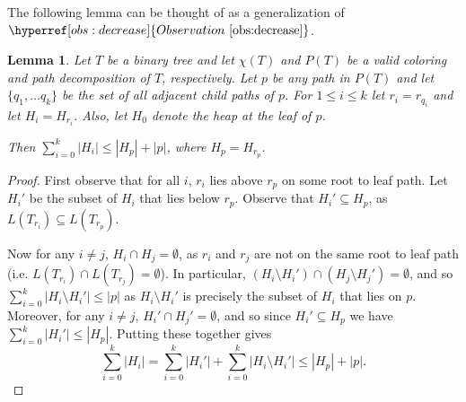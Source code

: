 \documentclass[11pt]{article}
\newtheorem{lemma}[theorem]{Lemma}
\newtheorem{definition}[theorem]{Definition}
\theoremstyle{definition}
\newcommand{\Obs}[1]{\hyperref[obs:#1]{Observation~\ref*{obs:#1}}} %
\begin{document}

The following lemma can be thought of as a generalization of $\Obs{decrease}$.

\begin{lemma}
\label{lem:adjacent}
 Let $T$ be a binary tree and let $\chi(T)$ and $P(T)$ be a valid coloring and path decomposition of $T$, respectively.
 Let $p$ be any path in $P(T)$ and let $\{q_1, \dots q_k\}$ be the set of all adjacent child paths of $p$.
 For $1\leq i\leq k$ let $r_i = r_{q_i}$ and let $H_i = H_{r_i}$.
 Also, let $H_0$ denote the heap at the leaf of $p$.
 
 Then $\sum_{i=0}^k |H_i| \leq |H_p|+|p|$, where $H_p = H_{r_p}$.
\end{lemma}
\begin{proof}
 First observe that for all $i$, $r_{i}$ lies above $r_p$ on some root to leaf path. 
 Let $H_i'$ be the subset of $H_i$ that lies below $r_p$.  Observe that $H_i'\subseteq H_p$, as $L(T_{r_i})\subseteq L(T_{r_p})$.
  
 Now for any $i\neq j$, $H_i \cap H_j = \emptyset$, as $r_{i}$ and $r_{j}$ are not on the same root to leaf path (i.e. $L(T_{r_i}) \cap L(T_{r_j}) = \emptyset$).
 In particular, $(H_i\setminus H_i') \cap (H_j \setminus H_j') = \emptyset$, and so $\sum_{i=0}^k |H_i\setminus H_i'| \leq |p|$ 
 as $H_i\setminus H_i'$ is precisely the subset of $H_i$ that lies on $p$.
 Moreover, for any $i\neq j$, $ H_i' \cap H_j' = \emptyset$, and so since $H_i'\subseteq H_p$ we have $\sum_{i=0}^k |H_i'|\leq |H_p|$.
 Putting these together gives
 \[
  \sum_{i=0}^k |H_i| = \sum_{i=0}^k |H_i'| + \sum_{i=0}^k |H_i\setminus H_i'| \leq |H_p|+|p|.
 \]
\end{proof}
\end{document}
